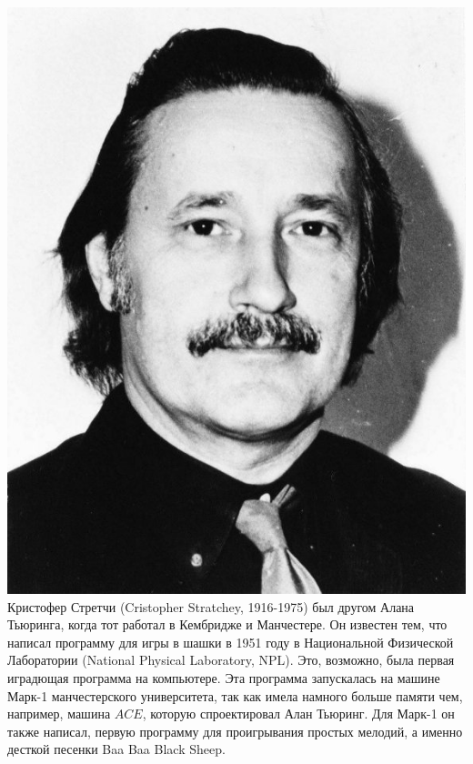 \documentclass[14pt]{matmex-diploma-custom}
\begin{document}
\includegraphics[angle=0,scale=0.2]{stratchey.jpg}
Кристофер Стретчи (Cristopher Stratchey, 1916-1975) был другом Алана Тьюринга, когда тот работал в Кембридже и Манчестере. Он известен тем, что написал программу для игры в шашки в 1951 году в Национальной Физической Лаборатории (National Physical Laboratory, NPL). Это, возможно, была первая иградющая программа на компьютере. Эта программа запускалась на машине Марк-1 манчестерского университета, так как имела намного больше памяти чем, например, машина $ACE$, которую спроектировал Алан Тьюринг. Для Марк-1 он также написал, первую программу для проигрывания простых мелодий, а именно десткой песенки Baa Baa Black Sheep.
\end{document}
